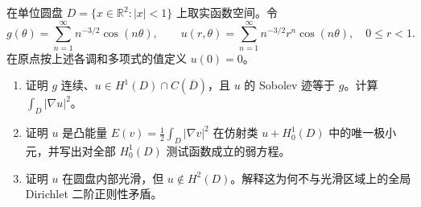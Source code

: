 \begin{exercise}[连续边值与二阶正则性的限制]\label{b2:ex:16-rough-trace-energy}
在单位圆盘 \(D=\{x\in\mathbb R^2:|x|<1\}\) 上取实函数空间。令
\[
 g(\theta)=\sum_{n=1}^\infty n^{-3/2}\cos(n\theta),\qquad
 u(r,\theta)=\sum_{n=1}^\infty n^{-3/2}r^n\cos(n\theta),\quad 0\leq r<1.
\]
在原点按上述各调和多项式的值定义 \(u(0)=0\)。
\begin{enumerate}
\item\label{b2:item:16-trace-energy-class}证明 \(g\) 连续、\(u\in H^1(D)\cap C(\overline D)\)，且 \(u\) 的 Sobolev 迹等于 \(g\)。计算 \(\int_D|\nabla u|^2\)。
\item\label{b2:item:16-trace-energy-minimum}证明 \(u\) 是凸能量 \(E(v)=\frac12\int_D|\nabla v|^2\) 在仿射类 \(u+H_0^1(D)\) 中的唯一极小元，并写出对全部 \(H_0^1(D)\) 测试函数成立的弱方程。
\item\label{b2:item:16-trace-energy-regularity}证明 \(u\) 在圆盘内部光滑，但 \(u\notin H^2(D)\)。解释这为何不与光滑区域上的全局 Dirichlet 二阶正则性矛盾。
\end{enumerate}
\end{exercise}
